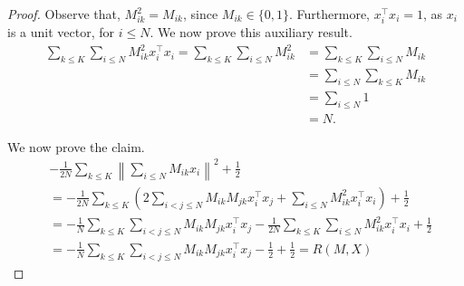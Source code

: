 \begin{proof}
%
Observe that, $M^2_{ik} = M_{ik}$, since $M_{ik} \in \{0, 1\}$. Furthermore, $x_i^\top x_i = 1$, as $x_i$ is a unit vector, for $i \leq N$. We now prove this auxiliary result.
%
\begin{align}
\sum_{k \leq K} \sum_{i \leq N} M_{ik}^2x_i^\top x_i
= \sum_{k \leq K} \sum_{i \leq N} M_{ik}^2
&= \sum_{k \leq K} \sum_{i \leq N} M_{ik}\\ 
&= \sum_{i \leq N}\sum_{k \leq K}M_{ik}\\\
&= \sum_{i \leq N} 1\\
&= N.
\end{align}

We now prove the claim.
%
\begin{align}
&- \frac{1}{2N}\sum_{k \leq K}\left\|\sum_{i \leq N} M_{ik}x_i\right\|^2 + \frac{1}{2}\\
&= -\frac{1}{2N}\sum_{k \leq K}\left(2\sum_{i < j \leq N}M_{ik}M_{jk}x_i^\top x_j + \sum_{i \leq N} M_{ik}^2 x_i^\top x_i\right) + \frac{1}{2}\\
&= -\frac{1}{N}\sum_{k \leq K}\sum_{i < j \leq N}M_{ik}M_{jk}x_i^\top x_j -\frac{1}{2N}\sum_{k \leq K} \sum_{i \leq N} M_{ik}^2 x_i^\top x_i + \frac{1}{2}\\
&= -\frac{1}{N}\sum_{k \leq K}\sum_{i < j \leq N}M_{ik}M_{jk}x_i^\top x_j -\frac{1}{2} + \frac{1}{2} = R(M, X)
\end{align}
%
\end{proof}

